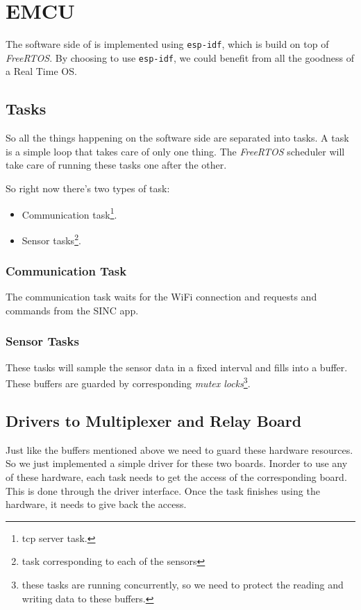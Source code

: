 \documentclass[../../main]{subfiles}
\begin{document}
\section{EMCU} \label{sec:}

The software side of \esp is implemented using \texttt{esp-idf}, which is build
on top of \emph{FreeRTOS}. By choosing to use \texttt{esp-idf}, we could benefit
from all the goodness of a Real Time OS.

\subsection{Tasks}

So all the things happening on the software side are separated into tasks. A task is
a simple loop that takes care of only one thing. The \emph{FreeRTOS} scheduler will
take care of running these tasks one after the other.

So right now there's two types of task:

\begin{itemize}
    \item Communication task\footnote{tcp server task.}.
    \item Sensor tasks\footnote{task corresponding to each of the sensors}.
\end{itemize}

\subsubsection{Communication Task}

The communication task waits for the WiFi connection and requests and commands from the
SINC app.

\subsubsection{Sensor Tasks}

These tasks will sample the sensor data in a fixed interval and fills into a buffer. These buffers
are guarded by corresponding \emph{mutex locks}\footnote{these tasks are running concurrently, so we need to
protect the reading and writing data to these buffers.}.

\subsection{Drivers to Multiplexer and Relay Board}

Just like the buffers mentioned above we need to guard these hardware resources. So we
just implemented a simple driver for these two boards. Inorder to use any of these
hardware, each task needs to get the access of the corresponding board. This is done
through the driver interface. Once the task finishes using the hardware, it needs to
give back the access.
\end{document}

